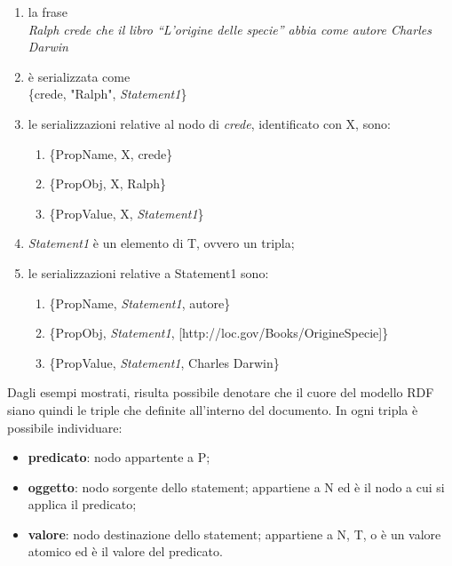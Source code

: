 \documentclass[12pt,a4paper,twoside]{book}
\begin{document}
\begin{enumerate}
\item la frase \\\textit{Ralph crede che il libro ``L'origine delle specie'' abbia come autore Charles Darwin}
\item è serializzata come \\ \{crede, "Ralph", \textit{Statement1}\}\newpage
\item le serializzazioni relative al nodo di \textit{crede}, identificato con X, sono:
\begin{enumerate}
\item \{PropName,  X, crede\}
\item \{PropObj,   X, Ralph\}
\item \{PropValue, X, \textit{Statement1}\}
\end{enumerate}
\item \textit{Statement1} è un elemento di T, ovvero un tripla;
\item le serializzazioni relative a Statement1 sono:
\begin{enumerate}
\item \{PropName, \textit{Statement1}, autore\}
\item \{PropObj, \textit{Statement1}, [http://loc.gov/Books/OrigineSpecie]\}
\item \{PropValue, \textit{Statement1}, Charles Darwin\}
\end{enumerate}
\end{enumerate}
Dagli esempi mostrati, risulta possibile denotare che il cuore del modello RDF siano quindi le triple che definite all'interno del documento. In ogni tripla è possibile individuare:
\begin{itemize}
\item \textbf{predicato}: nodo appartente a P;
\item \textbf{oggetto}: nodo sorgente dello statement; appartiene a N ed è il nodo a cui si applica il predicato;
\item \textbf{valore}: nodo destinazione dello statement; appartiene a N, T, o è un valore atomico ed è il valore del predicato.
\end{itemize}
\newpage
\end{document}
